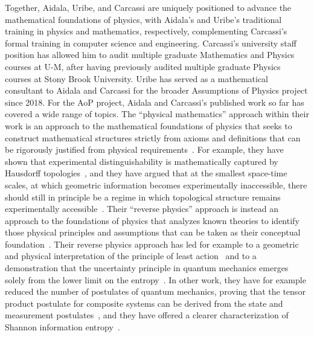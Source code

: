 Together, Aidala, Uribe, and Carcassi are uniquely positioned to advance the mathematical foundations of physics, with Aidala's and Uribe's traditional training in physics and mathematics, respectively, complementing Carcassi's formal training in computer science and engineering.  Carcassi's university staff position has allowed him to audit multiple graduate Mathematics and Physics courses at U-M, after having previously audited multiple graduate Physics courses at Stony Brook University.  Uribe has served as a mathematical consultant to Aidala and Carcassi for the broader Assumptions of Physics project since 2018.  For the AoP project, Aidala and Carcassi's published work so far has covered a wide range of topics.  The ``physical mathematics'' approach within their work is an approach to the mathematical foundations of physics that seeks to construct mathematical structures strictly from axioms and definitions that can be rigorously justified from physical requirements~\cite{aop-book}.  For example, they have shown that experimental distinguishability is mathematically captured by Hausdorff topologies~\cite{aop-book,aop-topExpDisting}, and they have argued that at the smallest space-time scales, at which geometric information becomes experimentally inaccessible, there should still in principle be a regime in which topological structure remains experimentally accessible~\cite{aop-spacetimeStruct}.  Their ``reverse physics'' approach is instead an approach to the foundations of physics that analyzes known theories to identify those physical principles and assumptions that can be taken as their conceptual foundation~\cite{aop-book,Carcassi:2022bpm}. Their reverse physics approach has led for example to a geometric and physical interpretation of the principle of least action~\cite{aop-action} and to a demonstration that the uncertainty principle in quantum mechanics emerges solely from the lower limit on the entropy~\cite{Carcassi:2022bpm}. In other work, they have for example reduced the number of postulates of quantum mechanics, proving that the tensor product postulate for composite systems can be derived from the state and measurement postulates~\cite{Carcassi2021four}, and they have offered a clearer characterization of Shannon information entropy~\cite{Carcassi:2021}. 

